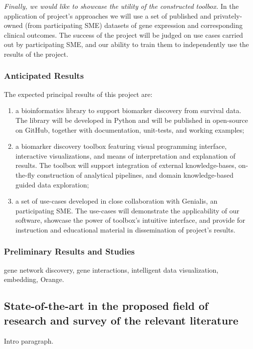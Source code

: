 \documentclass[11pt,a4paper]{article}
\begin{document}
{\em Finally, we would like to showcase the utility of the constructed toolbox.} In the application of project's approaches we will use a set of published and privately-owned (from participating SME) datasets of gene expression and corresponding clinical outcomes. The success of the project will be judged on use cases carried out by participating SME, and our ability to train them to independently use the results of the project.

\subsubsection*{Anticipated Results}
The expected principal results of this project are:
\begin{enumerate}
	\item a bioinformatics library to support biomarker discovery from survival data. The library will be developed in Python and will be published in open-source on GitHub, together with documentation, unit-tests, and working examples;
	\item a biomarker discovery toolbox featuring visual programming interface, interactive visualizations, and means of interpretation and explanation of results. The toolbox will support integration of external knowledge-bases, on-the-fly construction of analytical pipelines, and domain knowledge-based guided data exploration;
	\item a set of use-cases developed in close collaboration with Genialis, an participating SME. The use-cases will demonstrate the applicability of our software, showcase the power of toolbox's intuitive interface, and provide for instruction and educational material in dissemination of project's results.
\end{enumerate}

\subsubsection*{Preliminary Results and Studies}

gene network discovery, gene interactions, intelligent data visualization, embedding, Orange.

\subsection{State-of-the-art in the proposed field of research and survey of the relevant literature}

Intro paragraph.
\end{document}
